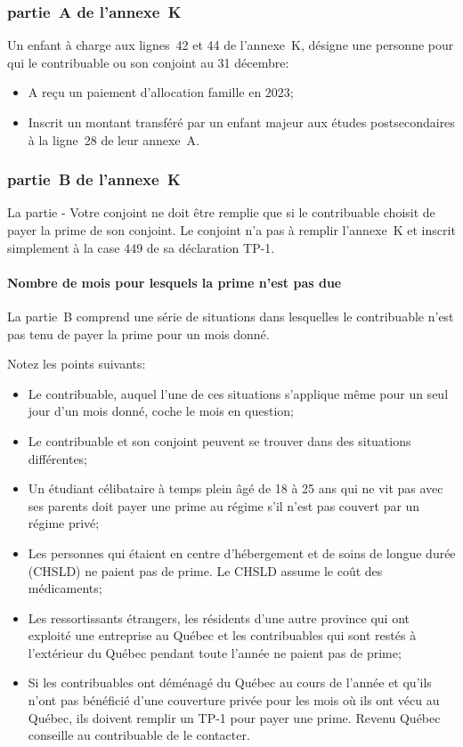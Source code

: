 \subsubsection{partie~A de l'annexe~K}
Un \og enfant à charge \fg{} aux lignes~42 et 44 de l'annexe~K, désigne une personne pour qui le contribuable ou son conjoint au 31 décembre:
\begin{itemize}
	\item A reçu un paiement d'allocation famille en 2023;
	\item Inscrit un montant transféré par un enfant majeur aux études postsecondaires à la ligne~28 de leur annexe~A.
\end{itemize}

\subsubsection{partie~B de l'annexe~K}
La partie  - Votre conjoint \fg{} ne doit être remplie que si le contribuable choisit de payer la prime de son conjoint. Le conjoint n'a pas à remplir l'annexe~K et inscrit simplement  \fg{} à la case 449 de sa déclaration TP-1.

\paragraph{Nombre de mois pour lesquels la prime n'est pas due}
La partie~B comprend une série de situations dans lesquelles le contribuable n'est pas tenu de payer la prime pour un mois donné.

Notez les points suivants:
\begin{itemize}
	\item Le contribuable, auquel l'une de ces situations s'applique même pour un seul jour d'un mois donné, coche le mois en question;
	\item Le contribuable et son conjoint peuvent se trouver dans des situations différentes;
	\item Un étudiant célibataire à temps plein âgé de 18 à 25 ans qui ne vit pas avec ses parents doit payer une prime au régime s'il n'est pas couvert par un régime privé;
	\item Les personnes qui étaient en centre d'hébergement et de soins de longue durée (CHSLD) ne paient pas de prime. Le CHSLD assume le coût des médicaments;
	\item Les ressortissants étrangers, les résidents d'une autre province qui ont exploité une entreprise au Québec et les contribuables qui sont restés à l'extérieur du Québec pendant toute l'année ne paient pas de prime;
	\item Si les contribuables ont déménagé du Québec au cours de l'année et qu'ils n'ont pas bénéficié d'une couverture privée pour les mois où ils ont vécu au Québec, ils doivent remplir un TP-1 pour payer une prime. Revenu Québec conseille au contribuable de le contacter.
\end{itemize}

